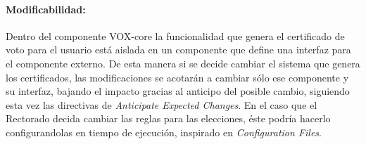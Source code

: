 \paragraph{Modificabilidad:}
Dentro del componente VOX-core la funcionalidad que genera el certificado de voto para el usuario está aislada en un componente que define una interfaz para el componente externo. De esta manera si se decide cambiar el sistema que genera los certificados, las modificaciones se acotarán a cambiar sólo ese componente y su interfaz, bajando el impacto gracias al anticipo del posible cambio, siguiendo esta vez las directivas de \textit{Anticipate Expected Changes}. En el caso que el Rectorado decida cambiar las reglas para las elecciones, éste podría hacerlo configurandolas en tiempo de ejecución, inspirado en \textit{Configuration Files}.


